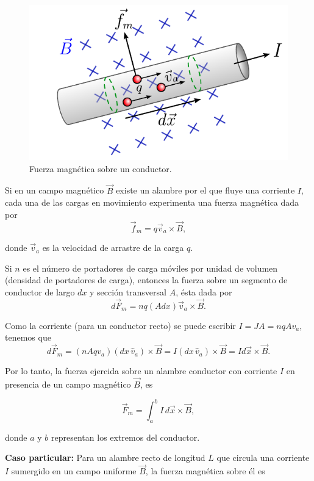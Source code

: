 \begin{figure}[H]
    \centering
    \includegraphics[scale = 0.95]{Figuras/Fuerza-Magnetica-Conductor.pdf}
    \caption{Fuerza magnética sobre un conductor.}
    \label{fig:Fm-Conductor}
\end{figure}

Si en un campo magnético $\vec{B}$ existe un alambre por el que fluye una corriente $I$, cada una de las cargas en movimiento experimenta una fuerza magnética dada por
$$\vec{f}_m = q \vec{v}_a \times \vec{B},$$

donde $\vec{v}_a$ es la velocidad de arrastre de la carga $q$.

Si $n$ es el número de portadores de carga móviles por unidad de volumen (densidad de portadores de carga), entonces la fuerza sobre un segmento de conductor de largo $dx$ y sección transversal $A$, ésta dada por
$$d\Vec{F}_m = n q (A dx) \Vec{v}_a \times \Vec{B}.$$

Como la corriente (para un conductor recto) se puede escribir $I = J A = n q A v_a$, tenemos que
$$d\vec{F}_m = (nAqv_a)(dx \,\hat{v}_a) \times \vec{B} = I (dx\, \hat{v}_a) \times \vec{B} = I d\vec{x} \times \vec{B}.$$

Por lo tanto, la fuerza ejercida sobre un alambre conductor con corriente $I$ en presencia de un campo magnético $\Vec{B}$, es
\begin{shaded}
    $$\Vec{F}_m = \int_a^b I \,d\Vec{x} \times \Vec{B},$$
\end{shaded}

donde $a$ y $b$ representan los extremos del conductor.

\textbf{Caso particular:} Para un alambre recto de longitud $L$ que circula una corriente $I$ sumergido en un campo uniforme $\vec{B}$, la fuerza magnética sobre él es

